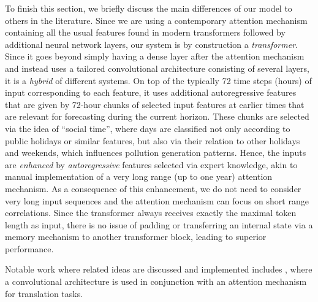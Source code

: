 To finish this section, we briefly discuss the main differences of our model to others in the literature. Since we are using a contemporary attention mechanism containing all the usual features found in modern transformers followed by additional neural network layers, our system is by construction a {\it transformer}. Since it goes beyond simply having a dense layer after the attention mechanism and instead uses a tailored convolutional architecture consisting of several layers, it is a {\it hybrid} of different systems. On top of the typically 72 time steps (hours) of input corresponding to each feature, it uses additional autoregressive features that are given by 72-hour chunks of selected input features at earlier times that are relevant for forecasting during the current horizon. These chunks are selected via the idea of ``social time'', where days are classified not only according to public holidays or similar features, but also via their relation to other holidays and weekends, which influences pollution generation patterns. Hence, the inputs are {\it enhanced} by {\it autoregressive} features selected via expert knowledge, akin to manual implementation of a very long range (up to one year) attention mechanism.  As a consequence of this enhancement, we do not need to consider very long input sequences and the attention mechanism can focus on short range correlations. Since the transformer always receives exactly the maximal token length as input, there is no issue of padding or transferring an internal state via a memory mechanism to another transformer block, leading to superior performance. 

Notable work where related ideas are discussed and implemented includes \cite{gehring2017convolutionalsequencesequencelearning}, where a convolutional architecture is used in conjunction with an attention mechanism for translation tasks.